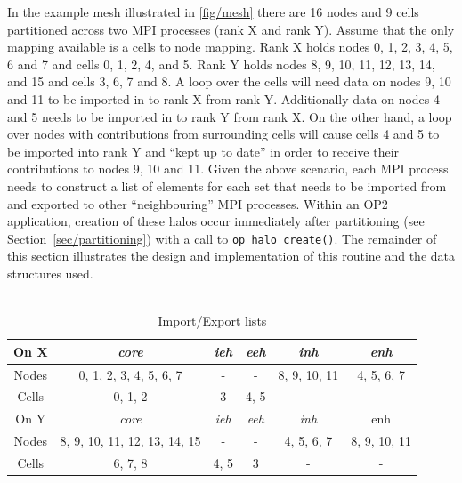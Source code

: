\documentclass[11pt]{article}
\begin{document}
\noindent In the example mesh illustrated in \figurename{ \ref{fig/mesh}} there
are 16 nodes and 9 cells partitioned across two MPI processes (rank X and rank
Y). Assume that the only mapping available is a cells to node mapping. Rank X
holds nodes 0, 1, 2, 3, 4, 5, 6 and 7 and cells 0, 1, 2, 4, and 5. Rank Y holds
nodes 8, 9, 10, 11, 12, 13, 14,  and 15 and cells 3, 6, 7 and 8. A loop over the
cells will need data on nodes 9, 10 and 11 to be imported in to rank X from
rank Y. Additionally data on nodes 4 and 5 needs to be imported in to rank Y
from rank X. On the other hand, a loop over nodes with contributions from
surrounding cells will cause cells 4 and 5 to be imported into rank Y and ``kept
up to date'' in order to receive their contributions to nodes 9, 10 and 11.
Given the above scenario, each MPI process needs to construct a list of elements
for each set that needs to be imported from and exported to other
``neighbouring'' MPI processes. Within an OP2 application, creation of these
halos occur immediately after partitioning (see Section~\ref{sec/partitioning}) with a call to
\texttt{op\_halo\_create()}. The remainder of this section illustrates the
design and implementation of this routine and the data structures used.\\\\


\begin{table}[t]
\centering\vspace{-10pt}
\caption{Import/Export lists}\small
\begin{tabular}{|c|c|c|c|c|c|} \hline
On X 	& \textit{core}	& \textit{ieh}	& \textit{eeh} 	& \textit{inh}	&
\textit{enh} 	\\\hline
Nodes	& 0, 1, 2, 3, 4, 5, 6, 7	& -	& -	& 8, 9, 10, 11	& 4, 5,
6, 7	\\\hline
Cells	& 0, 1, 2			& 3	& 4, 5	&	&\\\hline\hline
On Y 	& \textit{core}	& \textit{ieh}	& \textit{eeh}	& \textit{inh} & enh
\\\hline
Nodes	& 8, 9, 10, 11, 12, 13, 14, 15	& -	& -	& 4, 5, 6, 7	& 8, 9,
10, 11 	\\\hline
Cells	& 6, 7, 8	& 4, 5	& 3	& -		& - \\\hline
\end{tabular}\label{tab/impexp}\vspace{-0pt}
\end{table}\normalsize
\end{document}
